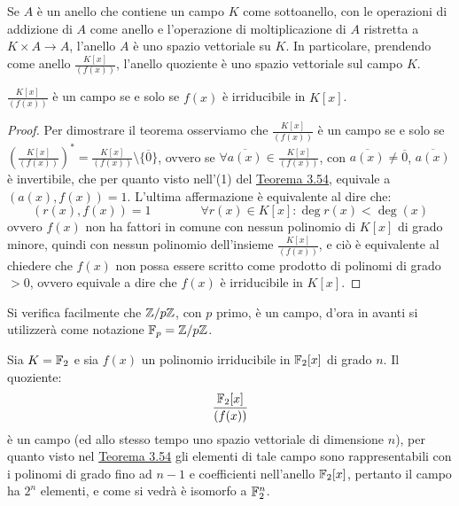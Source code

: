 \documentclass[11pt]{scrartcl}
\begin{document}
\begin{remark}
Se $A$ è un anello che contiene un campo $K$ come sottoanello, con le operazioni di addizione di $A$ come anello e l'operazione di moltiplicazione di $A$ ristretta a $K \times A \longrightarrow A$, l'anello $A$ è uno spazio vettoriale su $K$. In particolare, prendendo come anello $\frac{K[x]}{(f(x))}$, l'anello quoziente è uno spazio vettoriale sul campo $K$.
\end{remark}

\begin{corollary}
$\frac{K[x]}{(f(x))}$ è un campo se e solo se $f(x)$ è irriducibile in $K[x]$.
\end{corollary}

\begin{proof}
Per dimostrare il teorema osserviamo che $\frac{K[x]}{(f(x))}$ è un campo se e solo se $\left(\frac{K[x]}{(f(x))}\right)^* = \frac{K[x]}{(f(x))}\setminus\{\overline0\}$,
ovvero se $\forall \overline{a(x)} \in \frac{K[x]}{(f(x))}$, con $\overline{a(x)} \ne \overline 0$, $\overline{a(x)}$ è invertibile, che per quanto visto nell'(1) del 
\hyperref[p:3.54]{Teorema 3.54}, equivale a $(a(x),f(x)) = 1$. L'ultima affermazione è equivalente al dire che:
	\[ (r(x),f(x)) = 1
	\qquad\qquad
	\forall r(x) \in K[x]: \deg r(x) < \deg(x)
		\]
	ovvero $f(x)$ non ha fattori in comune con nessun polinomio di $K[x]$ di grado minore, quindi con nessun polinomio dell'insieme $\frac{K[x]}{(f(x))}$,
	e ciò è equivalente al chiedere che $f(x)$ non possa essere scritto come prodotto di polinomi di grado $>0$, ovvero equivale a dire che $f(x)$ è irriducibile in $K[x]$.
\end{proof}

\begin{remark}
Si verifica facilmente che ${\mathbb Z}/p{\mathbb Z}$, con $p$ primo, è un campo, d'ora in avanti si utilizzerà come notazione ${\mathbb F}_p = {\mathbb Z}/p{\mathbb Z}$.
\end{remark}

\begin{example}
Sia $K=\mathbb F_2$ e sia $f(x)$ un polinomio irriducibile in $\mathbb F_2[x]$ di grado $n$. Il quoziente:
	\[ \frac{\mathbb F_2[x]}{(f(x))}
	\]
è un campo (ed allo stesso tempo uno spazio vettoriale di dimensione $n$), per quanto visto nel \hyperref[p:3.53]{Teorema 3.54} gli elementi di tale campo sono rappresentabili con i polinomi di grado fino ad $n-1$ e coefficienti nell'anello $\mathbb F_2[x]$, pertanto il campo ha $2^n$ elementi, e come si vedrà è isomorfo a $\mathbb F_2^n$.
\end{example}
\end{document}
